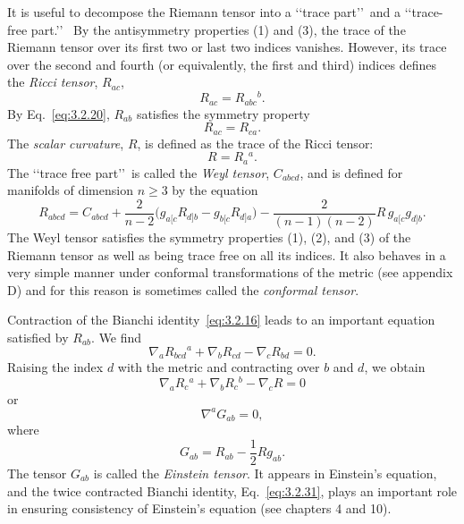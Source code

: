 It is useful to decompose the Riemann tensor into a \lq\lq trace part\rq\rq\ and a \lq\lq trace-free
part.\rq\rq\ %
By the antisymmetry properties (1) and (3), the trace of the Riemann tensor
over its first two or last two indices vanishes. However, its trace over the second and
fourth (or equivalently, the first and third) indices defines the \emph{Ricci tensor}, $R_{ac}$,
\begin{equation}
  R_{ac}=R_{abc}{}^b.
  \tag{3.2.25}\label{eq:3.2.25}
\end{equation}
By Eq.~\eqref{eq:3.2.20}, $R_{ab}$ satisfies the symmetry property
\begin{equation}
  R_{ac}=R_{ca}.
  \tag{3.2.26}\label{eq:3.2.26}
\end{equation}
The \emph{scalar curvature}, $R$, is defined as the trace of the Ricci tensor:
\begin{equation}
  R=R_a{}^a.
  \tag{3.2.27}\label{eq:3.2.27}
\end{equation}
The \lq\lq trace free part\rq\rq\ is called the \emph{Weyl tensor}, $C_{abcd}$, and is defined for manifolds of
dimension $n\geq3$ by the equation
\begin{equation}
  R_{abcd}=C_{abcd}+\frac{2}{n-2}
  \bigl(g_{a[c}R_{d]b}-g_{b[c}R_{d]a}\bigr)
  -\frac{2}{(n-1)(n-2)}R\,g_{a[c}g_{d]b}.
  \tag{3.2.28}\label{eq:3.2.28}
\end{equation}
The Weyl tensor satisfies the symmetry properties (1), (2), and (3) of the Riemann
tensor as well as being trace free on all its indices. It also behaves in a very simple
manner under conformal transformations of the metric (see appendix D) and for this
reason is sometimes called the \emph{conformal tensor}.

Contraction of the Bianchi identity~\eqref{eq:3.2.16} leads to an important equation
satisfied by $R_{ab}$. We find
\begin{equation}
  \nabla_aR_{bcd}{}^a+\nabla_bR_{cd}-\nabla_cR_{bd}=0.
  \tag{3.2.29}\label{eq:3.2.29}
\end{equation}
Raising the index $d$ with the metric and contracting over $b$ and $d$, we obtain
\begin{equation}
  \nabla_aR_c{}^a+\nabla_bR_c{}^b-\nabla_cR=0
  \tag{3.2.30}\label{eq:3.2.30}
\end{equation}
or
\begin{equation}
  \nabla^aG_{ab}=0,
  \tag{3.2.31}\label{eq:3.2.31}
\end{equation}
where
\begin{equation}
  G_{ab}=R_{ab}-\frac{1}{2}Rg_{ab}.
  \tag{3.2.32}\label{eq:3.2.32}
\end{equation}
The tensor $G_{ab}$ is called the \emph{Einstein tensor}. It appears in Einstein's equation, and the
twice contracted Bianchi identity, Eq.~\eqref{eq:3.2.31}, plays an important role in
ensuring consistency of Einstein's equation (see chapters 4 and 10).

